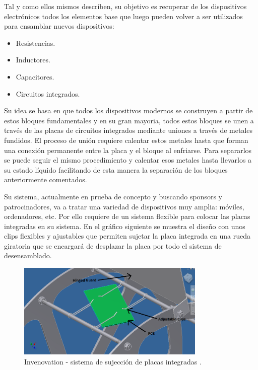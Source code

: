 Tal y como ellos mismos describen, su objetivo es recuperar de los dispositivos electrónicos todos los elementos base que luego pueden volver a ser utilizados para ensamblar nuevos dispositivos:

\begin{itemize}

\item{Resistencias.}
\item{Inductores.}
\item{Capacitores.}
\item{Circuitos integrados.}

\end{itemize}

Su idea se basa en que todos los dispositivos modernos se construyen a partir de estos bloques fundamentales y en su gran mayoria, todos estos bloques se unen a través de las placas de circuitos integrados mediante uniones a través de metales fundidos. El proceso de unión requiere calentar estos metales hasta que forman una conexión permanente entre la placa y el bloque al enfriarse. Para separarlos se puede seguir el mismo procedimiento y calentar esos metales hasta llevarlos a su estado líquido facilitando de esta manera la separación de los bloques anteriormente comentados. 

Su sistema, actualmente en prueba de concepto y buscando sponsors y patrocinadores, va a tratar una variedad de dispositivos muy amplia: móviles, ordenadores, etc. Por ello requiere de un sistema flexible para colocar las placas integradas en su sistema. En el gráfico siguiente se muestra el diseño con unos clips flexibles y ajustables que permiten sujetar la placa integrada en una rueda giratoria que se encargará de desplazar la placa por todo el sistema de desensamblado.

\begin{figure}[H]
\begin{center}
\includegraphics[width=0.8\textwidth]{img/D1}
\caption{Invenovation - sistema de sujección de placas integradas \cite{invenovation}.}
\end{center}
\end{figure}

